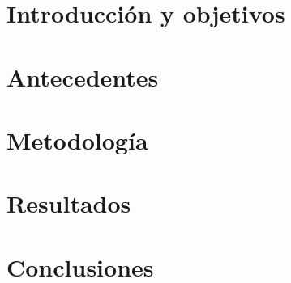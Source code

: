 \documentclass[12pt,dvipsnames,a4paper,twoside]{article}
\begin{document}
% 


\newpage
\section{Introducción y objetivos}




\newpage
\section{Antecedentes}



\newpage
\section{Metodología}




\newpage
\section{Resultados}




\newpage
\section{Conclusiones}
\end{document}
